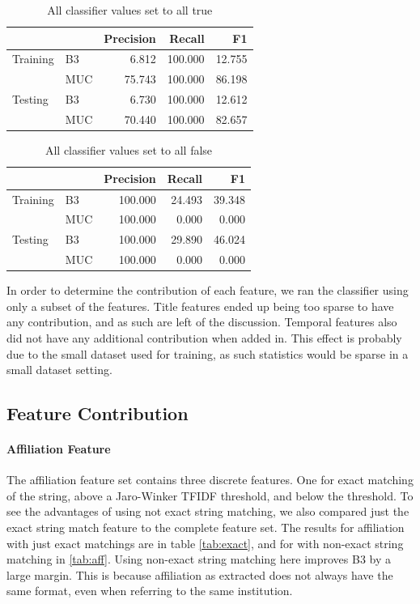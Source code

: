 \documentclass[twocolumn,letterpaper]{article}
\begin{document}
\begin{table}[ht]
\centering
\begin{tabular}{l || l | r r r}
 & & Precision & Recall & F1 \\ \hline
Training & B3 & 6.812 & 100.000 & 12.755 \\
 & MUC & 75.743 & 100.000 & 86.198 \\ \hline
Testing & B3 & 6.730 & 100.000 & 12.612 \\
 & MUC & 70.440 & 100.000 & 82.657 \\
\end{tabular}
\caption{All classifier values set to all true}
\label{tab:alltrue}
\end{table}

\begin{table}[ht]
\centering
\begin{tabular}{l || l | r r r}
 & & Precision & Recall & F1 \\ \hline
Training & B3 & 100.000 & 24.493 & 39.348 \\
 & MUC & 100.000 & 0.000 & 0.000\\ \hline
Testing & B3 & 100.000 & 29.890 & 46.024 \\
 & MUC & 100.000 & 0.000 & 0.000 \\
\end{tabular}
\caption{All classifier values set to all false}
\label{tab:allfalse}
\end{table}

In order to determine the contribution of each feature, we ran the classifier using only a subset of the features. Title features ended up being too sparse to have any contribution, and as such are left of the discussion. Temporal features also did not have any additional contribution when added in. This effect is probably due to the small dataset used for training, as such statistics would be sparse in a small dataset setting.

\subsection{Feature Contribution} %
\label{sub:feature_contribution}
\paragraph{Affiliation Feature} %
\label{par:affiliation_feature}
The affiliation feature set contains three discrete features. One for exact matching of the string, above a Jaro-Winker TFIDF threshold, and below the threshold. To see the advantages of using not exact string matching, we also compared just the exact string match feature to the complete feature set. The results for affiliation with just exact matchings are in table \ref{tab:exact}, and for with non-exact string matching in \ref{tab:aff}. Using non-exact string matching here improves B3 by a large margin. This is because affiliation as extracted does not always have the same format, even when referring to the same institution.
\end{document}
